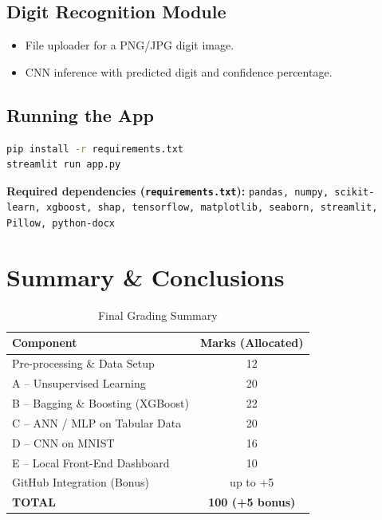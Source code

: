 \documentclass[12pt,a4paper]{article}
\begin{document}
\subsection{Digit Recognition Module}
\begin{itemize}
    \item File uploader for a PNG/JPG digit image.
    \item CNN inference with predicted digit and confidence percentage.
\end{itemize}

\subsection{Running the App}
\begin{lstlisting}[language=bash, caption={Launch the Streamlit app}]
pip install -r requirements.txt
streamlit run app.py
\end{lstlisting}

\textbf{Required dependencies (\texttt{requirements.txt}):}
\texttt{pandas, numpy, scikit-learn, xgboost, shap, tensorflow, matplotlib, seaborn, streamlit, Pillow, python-docx}

\section{Summary \& Conclusions}

\begin{table}[H]
\centering
\caption{Final Grading Summary}
\begin{tabular}{lc}
\toprule
\textbf{Component} & \textbf{Marks (Allocated)} \\
\midrule
Pre-processing \& Data Setup              & 12 \\
A -- Unsupervised Learning                & 20 \\
B -- Bagging \& Boosting (XGBoost)        & 22 \\
C -- ANN / MLP on Tabular Data            & 20 \\
D -- CNN on MNIST                         & 16 \\
E -- Local Front-End Dashboard            & 10 \\
GitHub Integration (Bonus)                & up to +5 \\
\midrule
\textbf{TOTAL}                            & \textbf{100 (+5 bonus)} \\
\bottomrule
\end{tabular}
\end{table}
\end{document}
